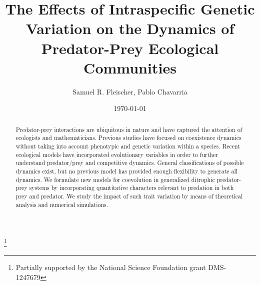 \documentclass{amsart}
\theoremstyle{definition}
\theoremstyle{remark}
\numberwithin{equation}{section}
\begin{document}
\title[]{The Effects of Intraspecific Genetic Variation on the Dynamics of Predator-Prey Ecological Communities}

\author{Samuel R. Fleischer, Pablo Chavarria}
\address{Department of Mathematics, California State University, Northridge}
\curraddr{}
\thanks{Partially supported by the National Science Foundation grant DMS-1247679}
\date{\today}























\begin{abstract}
Predator-prey interactions are ubiquitous in nature and have captured the attention of ecologists and mathematicians.  Previous studies have focused on coexistence dynamics without taking into account phenotypic and genetic variation within a species.  Recent ecological models have incorporated evolutionary variables in order to further understand predator/prey and competitive dynamics.  General classifications of possible dynamics exist, but no previous model has provided enough flexibility to generate all dynamics.  We formulate new models for coevolution in generalized ditrophic predator-prey systems by incorporating quantitative characters relevant to predation in both prey and predator.  We study the impact of such trait variation by means of theoretical analysis and numerical simulations.
\end{abstract}

\maketitle
\end{document}

